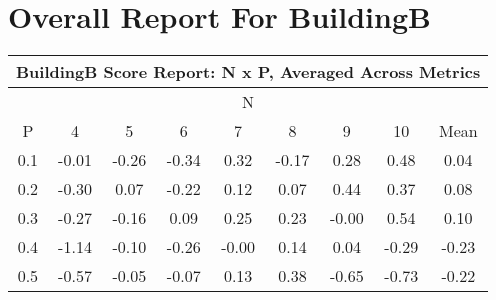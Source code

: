 \documentclass[11pt,a4paper]{report}
\begin{document}
\chapter{Overall Report For BuildingB}
\begin{longtable}{ | c || c | c | c | c | c | c | c || c |}
\hline
\multicolumn{9}{|c|}{ BuildingB Score Report: N x P, Averaged Across Metrics } \\
\hline
\multicolumn{9}{|c|}{ N } \\
\hline
P & 4 & 5 & 6 & 7 & 8 & 9 & 10 & Mean\\
\hline
\hline
\endhead
0.1 &  \cellcolor[HTML]{FFFFFF} -0.01 &  \cellcolor[HTML]{FFF7F7} -0.26 &  \cellcolor[HTML]{FFF7F7} -0.34 &  \cellcolor[HTML]{F7F7FF} 0.32 &  \cellcolor[HTML]{FFF7F7} -0.17 &  \cellcolor[HTML]{F7F7FF} 0.28 &  \cellcolor[HTML]{EFEFFF} 0.48 &  \cellcolor[HTML]{FFFFFF} 0.04 \\
0.2 &  \cellcolor[HTML]{FFF7F7} -0.30 &  \cellcolor[HTML]{FFFFFF} 0.07 &  \cellcolor[HTML]{FFF7F7} -0.22 &  \cellcolor[HTML]{FFFFFF} 0.12 &  \cellcolor[HTML]{FFFFFF} 0.07 &  \cellcolor[HTML]{F7F7FF} 0.44 &  \cellcolor[HTML]{F7F7FF} 0.37 &  \cellcolor[HTML]{FFFFFF} 0.08 \\
0.3 &  \cellcolor[HTML]{FFF7F7} -0.27 &  \cellcolor[HTML]{FFF7F7} -0.16 &  \cellcolor[HTML]{FFFFFF} 0.09 &  \cellcolor[HTML]{F7F7FF} 0.25 &  \cellcolor[HTML]{F7F7FF} 0.23 &  \cellcolor[HTML]{FFFFFF} -0.00 &  \cellcolor[HTML]{EFEFFF} 0.54 &  \cellcolor[HTML]{FFFFFF} 0.10 \\
0.4 &  \cellcolor[HTML]{FFDFDF} -1.14 &  \cellcolor[HTML]{FFFFFF} -0.10 &  \cellcolor[HTML]{FFF7F7} -0.26 &  \cellcolor[HTML]{FFFFFF} -0.00 &  \cellcolor[HTML]{FFFFFF} 0.14 &  \cellcolor[HTML]{FFFFFF} 0.04 &  \cellcolor[HTML]{FFF7F7} -0.29 &  \cellcolor[HTML]{FFF7F7} -0.23 \\
0.5 &  \cellcolor[HTML]{FFEFEF} -0.57 &  \cellcolor[HTML]{FFFFFF} -0.05 &  \cellcolor[HTML]{FFFFFF} -0.07 &  \cellcolor[HTML]{FFFFFF} 0.13 &  \cellcolor[HTML]{F7F7FF} 0.38 &  \cellcolor[HTML]{FFEFEF} -0.65 &  \cellcolor[HTML]{FFEFEF} -0.73 &  \cellcolor[HTML]{FFF7F7} -0.22 \\

\end{longtable}
\end{document}

